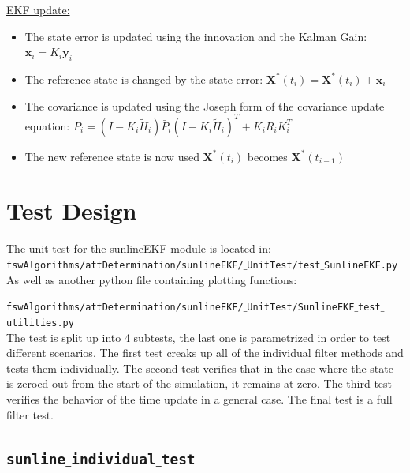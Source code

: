\documentclass[]{BasiliskReportMemo}
\begin{document}
 \underline{EKF update:}

\begin{itemize}
\item The state error is updated using the innovation and the Kalman Gain: $\bm x_i =   K_i\bm y_i $
\item The reference state is changed by the state error: $\bm X^*(t_i) =  \bm X^*(t_i) + \bm x_i $
\item The covariance is updated using the Joseph form of the covariance update equation:
$P_i = \left( I - K_i \tilde{H}_i\right) \bar{P}_{i} \left( I - K_i \tilde{H}_i\right)^T + K_i R_i K_i^T$
\item The new reference state is now used $\bm X^*(t_i)$ becomes $\bm X^*(t_{i-1})$
\end{itemize}

 


\section{Test Design}
The unit test for the sunlineEKF module is located in:\\

\noindent
{\tt fswAlgorithms/attDetermination/sunlineEKF/$\_$UnitTest/test$\_$SunlineEKF.py} \\

As well as another python file containing plotting functions:

\noindent
{\tt fswAlgorithms/attDetermination/sunlineEKF/$\_$UnitTest/SunlineEKF$\_$test$\_$utilities.py} \\

The test is split up into 4 subtests, the last one is parametrized in order to test different scenarios. The first test creaks up all of the individual filter methods and tests them individually. The second test verifies that in the case where the state is zeroed out from the start of the simulation, it remains at zero. The third test verifies the behavior of the time update in a general case. The final test is a full filter test.

\subsection{\texttt{sunline$\_$individual$\_$test}}
\end{document}
